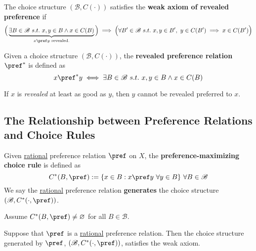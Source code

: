 \documentclass{article}
\begin{document}
		\begin{definition}[1.C.1]
			The choice structure $(\mathscr{B}, C(\cdot))$ satisfies the \textbf{weak axiom of revealed preference} if
			\begin{equation}
				\Big(\underbrace{
					\exists B \in \mathscr{B}\ s.t.\ x, y \in B \land x \in C(B)
					}_{\tx{$x \pref y$ revealed.}}
				\Big)
				\implies 
				\Big(
					\forall B' \in \mathscr{B}\ s.t.\ x, y \in B',\ y \in C(B') \implies x \in C(B')
				\Big)
			\end{equation}
		\end{definition}
		
		\begin{definition}
			Given a choice structure $(\mathscr{B}, C(\cdot))$, the \textbf{revealed preference relation} $\pref^*$ is defined as
			\begin{equation}
				x \pref^* y \iff \exists B \in \mathscr{B}\ s.t.\ x, y \in B \land x \in C(B)
			\end{equation}
		\end{definition}
		
		\begin{remark}
			If $x$ is \emph{revealed} at least as good as $y$, then $y$ cannot be revealed preferred to $x$.
		\end{remark}
	
	\subsection{The Relationship between Preference Relations and Choice Rules}
		\begin{definition}
			Given \ul{rational} preference relation $\pref$ on $X$, the \textbf{preference-maximizing choice rule} is defined as 
			\begin{equation}
				C^*(B, \pref) := \{x \in B: x \pref y\ \forall y \in B\}\ \forall B \in \mathscr{B}
			\end{equation}
			We say the \ul{rational} preference relation \textbf{generates} the choice structure $(\mathscr{B}, C^*(\cdot, \pref))$.
		\end{definition}
		
		\begin{assumption}
			Assume $C^*(B, \pref) \neq \varnothing$ for all $B \in \mathscr{B}$.
		\end{assumption}
		
		\begin{proposition}
			Suppose that $\pref$ is a \ul{rational} preference relation. Then the choice structure generated by $\pref$, $(\mathscr{B}, C^*(\cdot, \pref))$, satisfies the weak axiom.
		\end{proposition}
		
\end{document}
